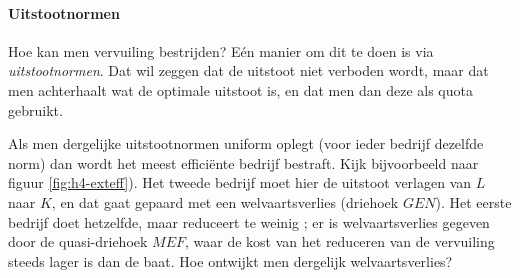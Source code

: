 \paragraph{Uitstootnormen}

Hoe kan men vervuiling bestrijden? E\'en manier om dit te doen is via \textit{uitstootnormen}. Dat wil zeggen dat de uitstoot niet verboden wordt, maar dat men achterhaalt wat de optimale uitstoot is, en dat men dan deze als quota gebruikt.\\

\par Als men dergelijke uitstootnormen uniform oplegt (voor ieder bedrijf dezelfde norm) dan wordt het meest effici\"ente bedrijf bestraft. Kijk bijvoorbeeld naar figuur \ref{fig:h4-exteff}). Het tweede bedrijf moet hier de uitstoot verlagen van $L$ naar $K$, en dat gaat gepaard met een  welvaartsverlies (driehoek $GEN$). Het eerste bedrijf doet hetzelfde, maar reduceert te weinig ; er is welvaartsverlies gegeven door de quasi-driehoek $MEF$, waar de kost van het reduceren van de vervuiling steeds lager is dan de baat.  Hoe ontwijkt men dergelijk welvaartsverlies?

